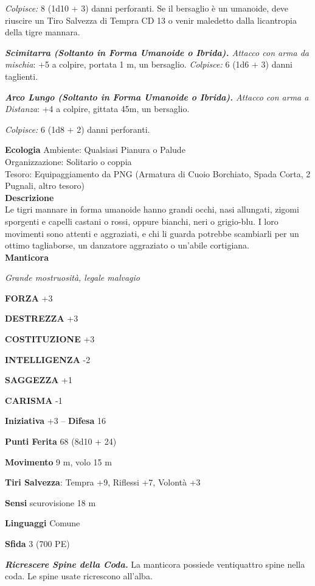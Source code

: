 \begin{multicols}{2}
\emph{Colpisce:} 8 (1d10 + 3) danni perforanti. Se il bersaglio è un umanoide, deve riuscire un Tiro Salvezza di Tempra CD 13 o venir maledetto dalla licantropia della tigre mannara.

\emph{\textbf{Scimitarra (Soltanto in Forma Umanoide o Ibrida).} Attacco con arma da mischia}: +5 a colpire, portata 1 m, un bersaglio. \emph{Colpisce:} 6 (1d6 + 3) danni taglienti.

\emph{\textbf{Arco Lungo (Soltanto in Forma Umanoide o Ibrida).} Attacco con arma a Distanza}: +4 a colpire, gittata 45m, un bersaglio.

\emph{Colpisce:} 6 (1d8 + 2) danni perforanti.

\textbf{Ecologia}
Ambiente: Qualsiasi Pianura o Palude\\
Organizzazione: Solitario o coppia\\
Tesoro: Equipaggiamento da PNG (Armatura di Cuoio Borchiato, Spada Corta, 2 Pugnali, altro tesoro)\\
\textbf{Descrizione}\\
Le tigri mannare in forma umanoide hanno grandi occhi, nasi allungati, zigomi sporgenti e capelli castani o rossi, oppure bianchi, neri o grigio-blu. I loro movimenti sono attenti e aggraziati, e chi li guarda potrebbe scambiarli per un ottimo tagliaborse, un danzatore aggraziato o un'abile cortigiana.\\


\medskip{}\textbf{Manticora}

\emph{Grande mostruosità, legale malvagio}

\textbf{FORZA} +3

\textbf{DESTREZZA} +3

\textbf{COSTITUZIONE} +3

\textbf{INTELLIGENZA} -2

\textbf{SAGGEZZA} +1

\textbf{CARISMA} -1

\textbf{Iniziativa} +3 -- \textbf{Difesa} 16

\textbf{Punti Ferita} 68 (8d10 + 24)

\textbf{Movimento} 9 m, volo 15 m

\textbf{Tiri Salvezza}: Tempra +9, Riflessi +7, Volontà +3

\textbf{Sensi} scurovisione 18 m

\textbf{Linguaggi} Comune

\textbf{Sfida} 3 (700 PE)

\emph{\textbf{Ricrescere Spine della Coda.}} La manticora possiede ventiquattro spine nella coda. Le spine usate ricrescono all'alba.


\end{multicols}
